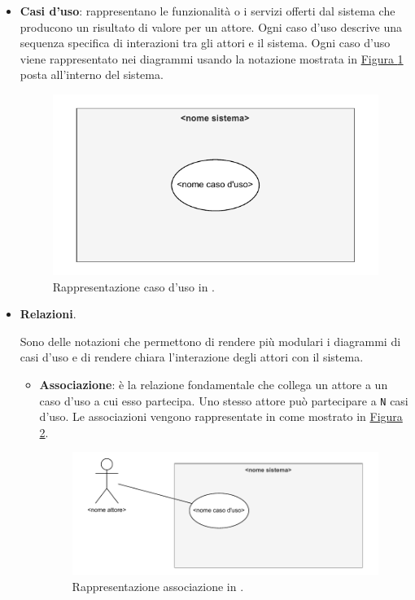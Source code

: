 \begin{itemize}
    \item \textbf{Casi d'uso}: rappresentano le funzionalità o i servizi offerti dal sistema che producono un risultato di valore per un attore. Ogni caso d'uso descrive una sequenza specifica di interazioni tra gli attori e il sistema.
    Ogni caso d'uso viene rappresentato nei diagrammi usando la notazione mostrata in \hyperref[fig:caso_uso]{Figura \ref{fig:caso_uso}} posta all'interno del sistema.
    \begin{figure}[H]
        \centering
        \includegraphics{Sezioni/ProcessiPrimari/Immagini/caso_uso.pdf}
        \caption{Rappresentazione caso d'uso in .}
        \label{fig:caso_uso}
    \end{figure}
    
    \item \textbf{Relazioni}.
    
    Sono delle notazioni che permettono di rendere più modulari i diagrammi di casi d'uso e di rendere chiara l'interazione degli attori con il sistema.
    
    \begin{itemize}
        \item \textbf{Associazione}: è la relazione fondamentale che collega un attore a un caso d'uso a cui esso partecipa.
        Uno stesso attore può partecipare a \texttt{N} casi d'uso.
        Le associazioni vengono rappresentate in  come mostrato in \hyperref[fig:associazione_uml]{Figura \ref{fig:associazione_uml}}.
        \begin{figure}[H]
            \centering
            \includegraphics{Sezioni/ProcessiPrimari/Immagini/associazione_uml.pdf}
            \caption{Rappresentazione associazione in .}
            \label{fig:associazione_uml}
        \end{figure}


\end{itemize}
\end{itemize}
